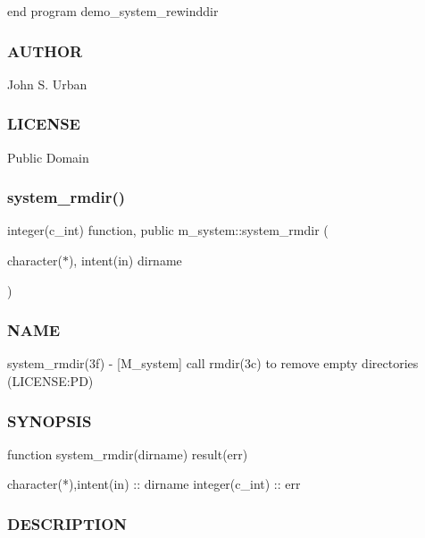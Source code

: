end program demo\+\_\+system\+\_\+rewinddir \subsubsection*{A\+U\+T\+H\+OR}

John S. Urban \subsubsection*{L\+I\+C\+E\+N\+SE}

Public Domain \mbox{\label{namespacem__system_a21fd3e1ccd50cef6adc539ef3d7a9836}} 
\subsubsection{\texorpdfstring{system\+\_\+rmdir()}{system\_rmdir()}}
{\footnotesize\ttfamily integer(c\+\_\+int) function, public m\+\_\+system\+::system\+\_\+rmdir (\begin{DoxyParamCaption}\item[{character($\ast$), intent(in)}]{dirname }\end{DoxyParamCaption})}



\subsubsection*{N\+A\+ME}

system\+\_\+rmdir(3f) -\/ \mbox{[}M\+\_\+system\mbox{]} call rmdir(3c) to remove empty directories (L\+I\+C\+E\+N\+SE\+:PD) 

\subsubsection*{S\+Y\+N\+O\+P\+S\+IS}

\begin{DoxyVerb}function system_rmdir(dirname) result(err)

 character(*),intent(in) :: dirname
 integer(c_int) :: err
\end{DoxyVerb}


\subsubsection*{D\+E\+S\+C\+R\+I\+P\+T\+I\+ON}

